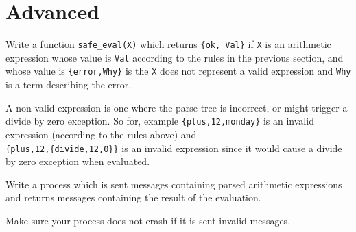 \documentclass[12pt]{hitec}
\begin{document}
\section{Advanced}
Write a function \verb+safe_eval(X)+ which returns \verb+{ok, Val}+
if \verb+X+ is an arithmetic expression whose value is \verb+Val+ according
to the rules in the previous section, and whose value is \verb+{error,Why}+
is the \verb+X+ does not represent a valid expression and \verb+Why+
is a term describing the error.

A non valid expression is one where the parse tree is incorrect, or
might trigger a divide by zero exception. So for, example
\verb+{plus,12,monday}+ is an invalid expression (according to the rules
above) and
\\
\verb+{plus,12,{divide,12,0}}+ is an invalid expression
since it would cause a divide by zero exception when evaluated.

Write a process which is sent messages containing parsed arithmetic expressions and returns
messages containing the result of the evaluation.

Make sure your process does not crash if it is sent invalid messages.
\end{document}
